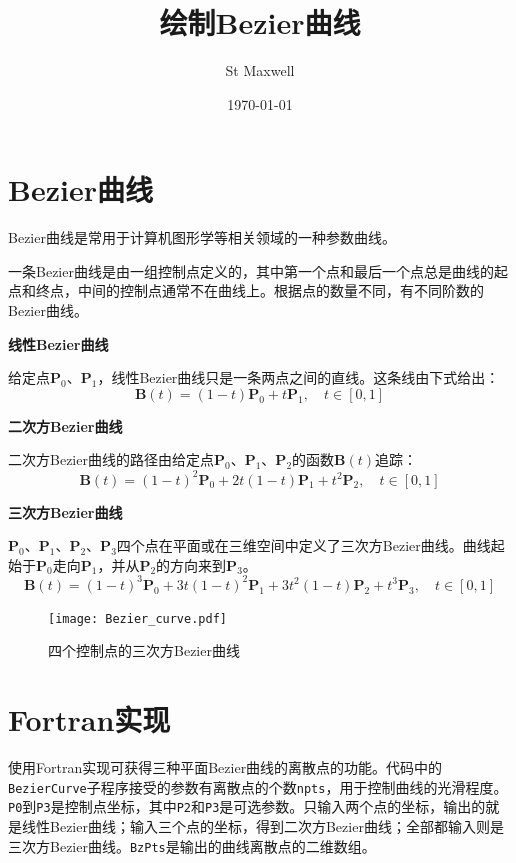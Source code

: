 \documentclass{ctexart}
\title{绘制Bezier曲线}
\author{St Maxwell}
\date{\today}
\begin{document}
\maketitle
\section{Bezier曲线}
Bezier曲线是常用于计算机图形学等相关领域的一种参数曲线。

一条Bezier曲线是由一组控制点定义的，其中第一个点和最后一个点总是曲线的起点和终点，中间的控制点通常不在曲线上。根据点的数量不同，有不同阶数的Bezier曲线。

\noindent
\textbf{线性Bezier曲线}

给定点$\mathbf{P}_0$、$\mathbf{P}_1$，线性Bezier曲线只是一条两点之间的直线。这条线由下式给出：
\[
\mathbf{B}(t) = (1 - t)\mathbf{P}_0 + t\mathbf{P}_1,\quad t \in [0, 1]
\]

\noindent
\textbf{二次方Bezier曲线}

二次方Bezier曲线的路径由给定点$\mathbf{P}_0$、$\mathbf{P}_1$、$\mathbf{P}_2$的函数$\mathbf{B}(t)$追踪：
\[
\mathbf{B}(t) = (1 - t)^2\mathbf{P}_0 + 2t(1-t)\mathbf{P}_1 + t^2\mathbf{P}_2,\quad t \in [0, 1]
\]

\noindent
\textbf{三次方Bezier曲线}

$\mathbf{P}_0$、$\mathbf{P}_1$、$\mathbf{P}_2$、$\mathbf{P}_3$四个点在平面或在三维空间中定义了三次方Bezier曲线。曲线起始于$\mathbf{P}_0$走向$\mathbf{P}_1$，并从$\mathbf{P}_2$的方向来到$\mathbf{P}_3$。
\[
\mathbf{B}(t) = (1 - t)^3\mathbf{P}_0 + 3t(1-t)^2\mathbf{P}_1 + 3t^2(1-t)\mathbf{P}_2 + t^3\mathbf{P}_3,\quad t \in [0, 1]
\]

\begin{figure}[htbp]
    \centering
    \texttt{[image: Bezier\_curve.pdf]}
    \caption{四个控制点的三次方Bezier曲线}
    \label{fig:plot1}
\end{figure}

\section{Fortran实现}
使用Fortran实现可获得三种平面Bezier曲线的离散点的功能。代码中的\texttt{BezierCurve}子程序接受的参数有离散点的个数\texttt{npts}，用于控制曲线的光滑程度。\texttt{P0}到\texttt{P3}是控制点坐标，其中\texttt{P2}和\texttt{P3}是可选参数。只输入两个点的坐标，输出的就是线性Bezier曲线；输入三个点的坐标，得到二次方Bezier曲线；全部都输入则是三次方Bezier曲线。\texttt{BzPts}是输出的曲线离散点的二维数组。
\end{document}
